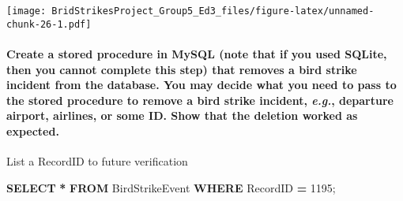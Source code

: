 \documentclass[
]{article}
\newenvironment{Shaded}{\begin{snugshade}}{\end{snugshade}}
\newcommand{\DecValTok}[1]{\textcolor[rgb]{0.00,0.00,0.81}{#1}}
\newcommand{\KeywordTok}[1]{\textcolor[rgb]{0.13,0.29,0.53}{\textbf{#1}}}
\newcommand{\NormalTok}[1]{#1}
\newcommand{\OperatorTok}[1]{\textcolor[rgb]{0.81,0.36,0.00}{\textbf{#1}}}
\begin{document}
\texttt{[image: BridStrikesProject\_Group5\_Ed3\_files/figure-latex/unnamed-chunk-26-1.pdf]}

\hypertarget{create-a-stored-procedure-in-mysql-note-that-if-you-used-sqlite-then-you-cannot-complete-this-step-that-removes-a-bird-strike-incident-from-the-database.-you-may-decide-what-you-need-to-pass-to-the-stored-procedure-to-remove-a-bird-strike-incident-e.g.-departure-airport-airlines-or-some-id.-show-that-the-deletion-worked-as-expected.}{%
\paragraph{\texorpdfstring{Create a stored procedure in MySQL (note that
if you used SQLite, then you cannot complete this step) that removes a
bird strike incident from the database. You may decide what you need to
pass to the stored procedure to remove a bird strike incident,
\emph{e.g.}, departure airport, airlines, or some ID. Show that the
deletion worked as
expected.}{Create a stored procedure in MySQL (note that if you used SQLite, then you cannot complete this step) that removes a bird strike incident from the database. You may decide what you need to pass to the stored procedure to remove a bird strike incident, e.g., departure airport, airlines, or some ID. Show that the deletion worked as expected.}}\label{create-a-stored-procedure-in-mysql-note-that-if-you-used-sqlite-then-you-cannot-complete-this-step-that-removes-a-bird-strike-incident-from-the-database.-you-may-decide-what-you-need-to-pass-to-the-stored-procedure-to-remove-a-bird-strike-incident-e.g.-departure-airport-airlines-or-some-id.-show-that-the-deletion-worked-as-expected.}}

List a RecordID to future verification

\begin{Shaded}
\begin{Highlighting}[]
\KeywordTok{SELECT} \OperatorTok{*} \KeywordTok{FROM}\NormalTok{ BirdStrikeEvent }\KeywordTok{WHERE}\NormalTok{ RecordID }\OperatorTok{=} \DecValTok{1195}\NormalTok{;}
\end{Highlighting}
\end{Shaded}
\end{document}
